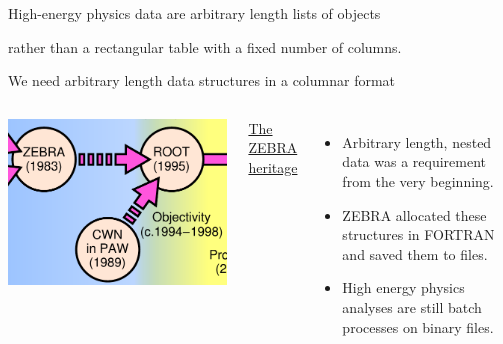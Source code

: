 \documentclass[aspectratio=169]{beamer}
\begin{document}
\begin{frame}[fragile]{High-energy physics data are arbitrary length lists of objects}
\begin{uncoverenv}
\begin{center}
{\begin{minipage}{0.85\linewidth}
\begin{center}
\begin{minipage}{0.85\linewidth}
rather than a rectangular table with a fixed number of columns.
\end{minipage}
\vspace{0.5 cm}
\end{center}
\end{minipage}}
\end{center}
\end{uncoverenv}
\vspace{7 cm}
\end{frame}

\begin{frame}{We need arbitrary length data structures in a columnar format}
\vspace{0.35 cm}

\begin{columns}[t]
\vspace{1 cm}
\includegraphics[width=\linewidth]{history-cropped.png}

\underline{\large The ZEBRA heritage}

\vspace{0.25 cm}
\begin{itemize}
\item Arbitrary length, nested data was a requirement from the very beginning.
\item ZEBRA allocated these structures in FORTRAN and saved them to files.
\item High energy physics analyses are still batch processes on binary files.
\end{itemize}


\end{columns}
\end{frame}
\end{document}
